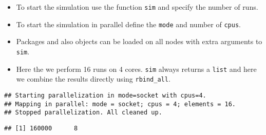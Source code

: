 \begin{itemize}
\itemsep1pt\parskip0pt
\item
  To start the simulation use the function \texttt{sim} and specify the
  number of runs.
\item
  To start the simulation in parallel define the \texttt{mode} and
  number of \texttt{cpus}.
\item
  Packages and also objects can be loaded on all nodes with extra
  arguments to \texttt{sim}.
\item
  Here the we perform 16 runs on 4 cores. \texttt{sim} always returns a
  \texttt{list} and here we combine the results directly using
  \texttt{rbind\_all}.
\end{itemize}

\begin{Shaded}
\end{Shaded}

\begin{verbatim}
## Starting parallelization in mode=socket with cpus=4.
## Mapping in parallel: mode = socket; cpus = 4; elements = 16.
## Stopped parallelization. All cleaned up.
\end{verbatim}

\begin{verbatim}
## [1] 160000      8
\end{verbatim}
